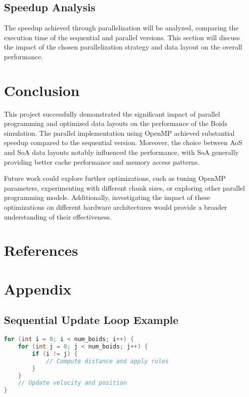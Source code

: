 \documentclass[10pt,twocolumn,letterpaper]{article}
\begin{document}
\subsection{Speedup Analysis}
The speedup achieved through parallelization will be analyzed, comparing the execution time of the sequential and parallel versions. This section will discuss the impact of the chosen parallelization strategy and data layout on the overall performance.

\section{Conclusion}
This project successfully demonstrated the significant impact of parallel programming and optimized data layouts on the performance of the Boids simulation. The parallel implementation using OpenMP achieved substantial speedup compared to the sequential version. Moreover, the choice between AoS and SoA data layouts notably influenced the performance, with SoA generally providing better cache performance and memory access patterns.

Future work could explore further optimizations, such as tuning OpenMP parameters, experimenting with different chunk sizes, or exploring other parallel programming models. Additionally, investigating the impact of these optimizations on different hardware architectures would provide a broader understanding of their effectiveness.

\section*{References}

\appendix
\section*{Appendix}

\subsection*{Sequential Update Loop Example}
\label{appendix:seqcode}
\begin{lstlisting}[language=C++]
for (int i = 0; i < num_boids; i++) {
    for (int j = 0; j < num_boids; j++) {
        if (i != j) {
            // Compute distance and apply rules
        }
    }
    // Update velocity and position
}
\end{lstlisting}
\end{document}
